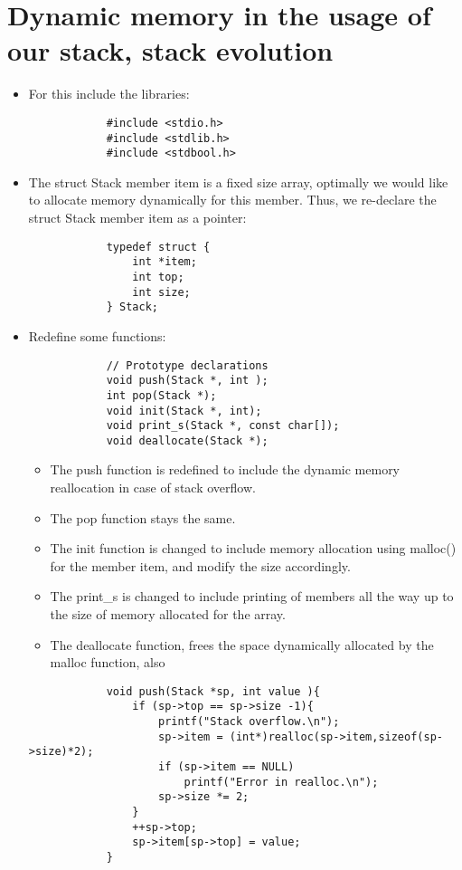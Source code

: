 \section{Dynamic memory in the usage of our stack, stack evolution}
\begin{itemize}
    \item For this include the libraries:
        \begin{verbatim}
            #include <stdio.h>
            #include <stdlib.h>
            #include <stdbool.h>
        \end{verbatim}

    \item The struct Stack member item is a fixed size array, optimally we would like to allocate memory dynamically for this member. Thus, we re-declare the struct Stack member item as a pointer: 
        \begin{verbatim}
            typedef struct {
                int *item;
                int top; 
                int size; 
            } Stack; 
        \end{verbatim}
    
    \item Redefine some functions:
        \begin{verbatim}
            // Prototype declarations
            void push(Stack *, int );
            int pop(Stack *);
            void init(Stack *, int);
            void print_s(Stack *, const char[]);
            void deallocate(Stack *);
        \end{verbatim}
        \begin{itemize}
            \item The push function is redefined to include the dynamic memory reallocation in case of stack overflow.
            \item The pop function stays the same.
            \item The init function is changed to include memory allocation using malloc() for the member item, and modify the size accordingly.
            \item The print\_s is changed to include printing of members all the way up to the size of memory allocated for the array.
            \item The deallocate function, frees the space dynamically allocated by the malloc function, also 
        \end{itemize}
        \begin{verbatim}
            void push(Stack *sp, int value ){
                if (sp->top == sp->size -1){
                    printf("Stack overflow.\n");
                    sp->item = (int*)realloc(sp->item,sizeof(sp->size)*2);
                    if (sp->item == NULL)
                        printf("Error in realloc.\n");
                    sp->size *= 2;
                }
                ++sp->top;
                sp->item[sp->top] = value;
            }


\end{verbatim}
\end{itemize}
